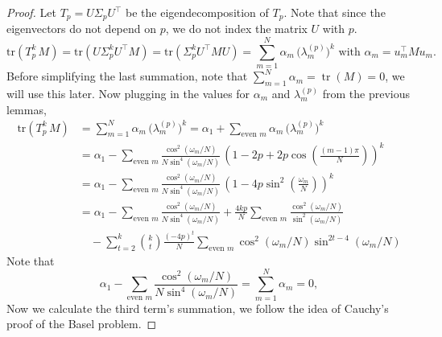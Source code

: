 \documentclass[12pt]{article}
\theoremstyle{definition}
\newcommand{\tr}{\operatorname{tr}}
\begin{document}
\begin{proof}
    Let $T_p = U\Sigma_pU^\top$ be the eigendecomposition of $T_p$. Note that since the eigenvectors do not depend on $p$, we do not index the matrix $U$ with $p$. 
    \[
\mathrm{tr }(T_p^k\,M)
= \mathrm{tr} \left(  U \Sigma_p^k U^{\top} M \right)
= \mathrm{tr} \left(   \Sigma_p^k U^{\top} M U \right)
= \sum_{m=1}^{N} \alpha_m\,\bigl(\lambda_m^{(p)}\bigr)^k \text{ with  } \alpha_m = u^{\top}_m M u_m.
\] 
Before simplifying the last summation, note that $\sum_{m = 1}^N \alpha_m = \tr\left(M\right) = 0$, we will use this later. Now plugging in the values for $\alpha_m$ and $\lambda_m^{(p)}$ from the previous lemmas,
\begin{align*}
\mathrm{tr }(T_p^k\,M) &= \sum_{m=1}^{N} \alpha_m\,\bigl(\lambda_m^{(p)}\bigr)^k 
= \alpha_1 +\sum_{\text{even }m} \alpha_m\,\bigl(\lambda_m^{(p)}\bigr)^k\\
&= \alpha_1 -\sum_{\text{even }m} \frac{\cos^2\left(\omega_m/N\right)}{N\sin^4\left(\omega_m/N\right)}\,\left(1-2p+2p\cos\left(\frac{(m-1)\pi}{N}\right)\right)^k\\
&= \alpha_1 -\sum_{\text{even }m} \frac{\cos^2\left(\omega_m/N\right)}{N\sin^4\left(\omega_m/N\right)}\,\left(1-4p\sin^2\left(\frac{\omega_m}{N}\right)\right)^k \\
&=\alpha_1 - \sum_{\text{even }m} \frac{\cos^2\left(\omega_m/N\right)}{N\sin^4\left(\omega_m/N\right)} + \frac{4kp}{N}\sum_{\text{even }m} \frac{\cos^2\left(\omega_m/N\right)}{\sin^2\left(\omega_m/N\right)}\\
&\quad -\sum_{t=2}^k\binom{k}{t}\frac{(-4p)^t}{N}\sum_{\text{even }m}\cos^2\left(\omega_m/N\right)\sin^{2t-4}\left(\omega_m/N\right)
\end{align*}
Note that 
\[
\alpha_1 - \sum_{\text{even }m} \frac{\cos^2\left(\omega_m/N\right)}{N\sin^4\left(\omega_m/N\right)} = \sum_{m=1}^N\alpha_m = 0,
\]
Now we calculate the third term's summation,  we follow the idea of Cauchy's proof of the Basel problem.  


\end{proof}
\end{document}
